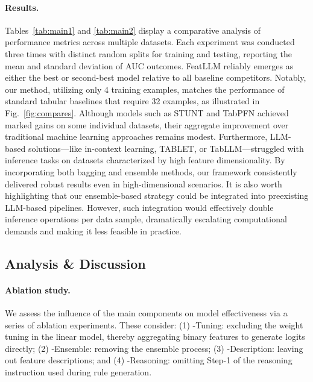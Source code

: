 \vspace*{-0.12in}
\paragraph{Results.}
Tables~\ref{tab:main1} and \ref{tab:main2} display a comparative analysis of performance metrics across multiple datasets. Each experiment was conducted three times with distinct random splits for training and testing, reporting the mean and standard deviation of AUC outcomes. \textsf{FeatLLM} reliably emerges as either the best or second-best model relative to all baseline competitors. Notably, our method, utilizing only 4 training examples, matches the performance of standard tabular baselines that require 32 examples, as illustrated in Fig.~\ref{fig:compares}. Although models such as STUNT and TabPFN achieved marked gains on some individual datasets, their aggregate improvement over traditional machine learning approaches remains modest. Furthermore, LLM-based solutions—like in-context learning, TABLET, or TabLLM—struggled with inference tasks on datasets characterized by high feature dimensionality. By incorporating both bagging and ensemble methods, our framework consistently delivered robust results even in high-dimensional scenarios. It is also worth highlighting that our ensemble-based strategy could be integrated into preexisting LLM-based pipelines. However, such integration would effectively double inference operations per data sample, dramatically escalating computational demands and making it less feasible in practice.

\subsection{Analysis \& Discussion}
\label{sec:analysis}
\paragraph{Ablation study.} We assess the influence of the main components on model effectiveness via a series of ablation experiments. These consider: (1) \textsf{-Tuning}: excluding the weight tuning in the linear model, thereby aggregating binary features to generate logits directly; (2) \textsf{-Ensemble}: removing the ensemble process; (3) \textsf{-Description}: leaving out feature descriptions; and (4) \textsf{-Reasoning}: omitting Step-1 of the reasoning instruction used during rule generation.

